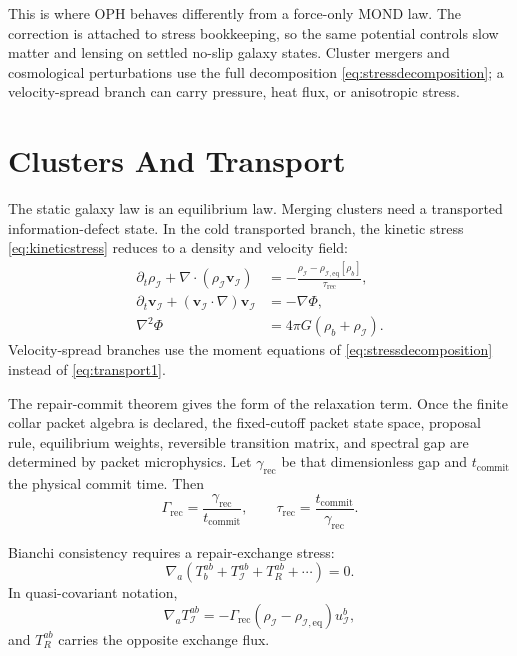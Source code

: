 \documentclass[11pt]{article}
\begin{document}
This is where OPH behaves differently from a force-only MOND law.  The
correction is attached to stress bookkeeping, so the same potential controls
slow matter and lensing on settled no-slip galaxy states.  Cluster mergers and
cosmological perturbations use the full decomposition
\eqref{eq:stressdecomposition}; a velocity-spread branch can carry pressure,
heat flux, or anisotropic stress.

\section{Clusters And Transport}

The static galaxy law is an equilibrium law.  Merging clusters need a
transported information-defect state.  In the cold transported branch, the
kinetic stress \eqref{eq:kineticstress} reduces to a density and velocity
field:
\begin{align}
  \partial_t\rho_{\mathcal I}
    +\nabla\cdot(\rho_{\mathcal I}\mathbf v_{\mathcal I})
    &=-\frac{\rho_{\mathcal I}
      -\rho_{\mathcal I,\mathrm{eq}}[\rho_b]}{\tau_{\mathrm{rec}}},
    \label{eq:transport1}\\
  \partial_t\mathbf v_{\mathcal I}
    +(\mathbf v_{\mathcal I}\cdot\nabla)\mathbf v_{\mathcal I}
    &=-\nabla\Phi,
    \label{eq:transport2}\\
  \nabla^2\Phi&=4\pi G(\rho_b+\rho_{\mathcal I}).
    \label{eq:transport3}
\end{align}
Velocity-spread branches use the moment equations of
\eqref{eq:stressdecomposition} instead of \eqref{eq:transport1}.

The repair-commit theorem gives the form of the relaxation term.  Once the
finite collar packet algebra is declared, the fixed-cutoff packet state space,
proposal rule, equilibrium weights, reversible transition matrix, and spectral
gap are determined by packet microphysics.  Let \(\gamma_{\mathrm{rec}}\) be
that dimensionless gap and \(t_{\mathrm{commit}}\) the physical commit time.
Then
\begin{equation}
  \Gamma_{\mathrm{rec}}
   =\frac{\gamma_{\mathrm{rec}}}{t_{\mathrm{commit}}},
  \qquad
  \tau_{\mathrm{rec}}
   =\frac{t_{\mathrm{commit}}}{\gamma_{\mathrm{rec}}}.
\end{equation}

Bianchi consistency requires a repair-exchange stress:
\begin{equation}
  \nabla_a(T_b^{ab}+T_{\mathcal I}^{ab}+T_R^{ab}+\cdots)=0.
\end{equation}
In quasi-covariant notation,
\begin{equation}
  \nabla_a T_{\mathcal I}^{ab}
  =
  -\Gamma_{\mathrm{rec}}
  (\rho_{\mathcal I}-\rho_{\mathcal I,\mathrm{eq}})
  u_{\mathcal I}^b,
\end{equation}
and \(T_R^{ab}\) carries the opposite exchange flux.
\end{document}
